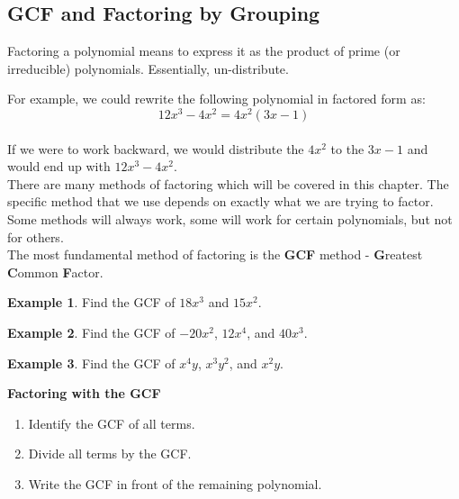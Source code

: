 \documentclass[addpoints,12pt]{exam}
\theoremstyle{definition}
\theoremstyle{break}
\theoremstyle{break}
\newtheorem{example}{Example}[subsection]
\begin{document}
\setcounter{section}{6}
\setcounter{subsection}{0}

\subsection{GCF and Factoring by Grouping}

\vspace{.15in}
\begin{definition}[Factor]
Factoring a polynomial means to express it as the product of prime (or irreducible) polynomials. Essentially, un-distribute.
\end{definition}
\vspace{.15in}

For example, we could rewrite the following polynomial in factored form as:
\[12x^3 - 4x^2 = 4x^2(3x-1)\]
\\
If we were to work backward, we would distribute the $4x^2$ to the $3x-1$ and would end up with $12x^3 - 4x^2$.\\

There are many methods of factoring which will be covered in this chapter. The specific method that we use depends on exactly what we are trying to factor. Some methods will always work, some will work for certain polynomials, but not for others.\\

The most fundamental method of factoring is the \textbf{GCF} method - \textbf{G}reatest \textbf{C}ommon \textbf{F}actor.

\begin{example}
Find the GCF of $18x^3$ and $15x^2$.
\vspace{1.25in}
\end{example}

\begin{example}
Find the GCF of $-20x^2$, $12x^4$, and $40x^3$.
\end{example}

\newpage

\begin{example}
Find the GCF of $x^4y$, $x^3y^2$, and $x^2y$.
\vspace{1.25in}
\end{example}

\begin{mdframed}
\textbf{Factoring with the GCF}
\begin{enumerate}
\item Identify the GCF of all terms.
\item Divide all terms by the GCF.
\item Write the GCF in front of the remaining polynomial.
\end{enumerate}
\end{mdframed}
\end{document}
